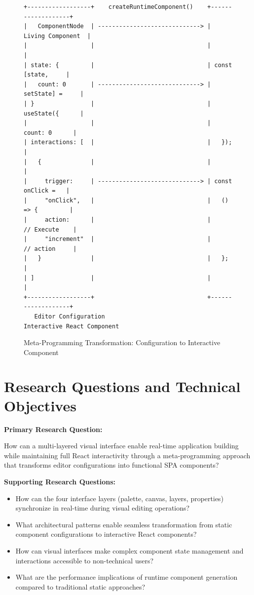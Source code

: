 \documentclass[oneside,11pt]{book}
\begin{document}
\begin{figure}[h]
\centering
\begin{verbatim}
+------------------+    createRuntimeComponent()    +-------------------+
|   ComponentNode  | -----------------------------> | Living Component  |
|                  |                                |                   |
| state: {         |                                | const [state,     |
|   count: 0       | -----------------------------> |   setState] =     |
| }                |                                |   useState({      |
|                  |                                |     count: 0      |
| interactions: [  |                                |   });             |
|   {              |                                |                   |
|     trigger:     | -----------------------------> | const onClick =   |
|     "onClick",   |                                |   () => {         |
|     action:      |                                |     // Execute    |
|     "increment"  |                                |     // action     |
|   }              |                                |   };              |
| ]                |                                |                   |
+------------------+                                +-------------------+
   Editor Configuration                             Interactive React Component
\end{verbatim}
\caption{Meta-Programming Transformation: Configuration to Interactive Component}
\label{fig:meta-programming-transformation}
\end{figure}

\section{Research Questions and Technical Objectives}
\label{sec:research-objectives}

\textbf{Primary Research Question:}

How can a multi-layered visual interface enable real-time application building while maintaining full React interactivity through a meta-programming approach that transforms editor configurations into functional \gls{SPA} components?

\textbf{Supporting Research Questions:}

\begin{itemize}
    \item How can the four interface layers (palette, canvas, layers, properties) synchronize in real-time during visual editing operations?
    \item What architectural patterns enable seamless transformation from static component configurations to interactive React components?
    \item How can visual interfaces make complex component state management and interactions accessible to non-technical users?
    \item What are the performance implications of runtime component generation compared to traditional static approaches?
\end{itemize}
\end{document}
